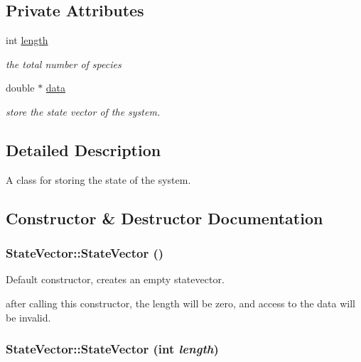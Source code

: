 \subsection*{Private Attributes}
\begin{CompactItemize}
\item 
\hypertarget{class_state_vector_ff012ea1d77d2ca71e36b47960d45db8}{
int \hyperlink{class_state_vector_ff012ea1d77d2ca71e36b47960d45db8}{length}}
\label{class_state_vector_ff012ea1d77d2ca71e36b47960d45db8}

\begin{CompactList}\small\item\em the total number of species \item\end{CompactList}\item 
double $\ast$ \hyperlink{class_state_vector_1bbbbb188a0b7cdb6c4c19591d771855}{data}
\begin{CompactList}\small\item\em store the state vector of the system. \item\end{CompactList}\end{CompactItemize}


\subsection{Detailed Description}
A class for storing the state of the system. 



\subsection{Constructor \& Destructor Documentation}
\hypertarget{class_state_vector_6559f412ce6cc17afbb958139961010f}{
\subsubsection{\setlength{\rightskip}{0pt plus 5cm}StateVector::StateVector ()}}
\label{class_state_vector_6559f412ce6cc17afbb958139961010f}


Default constructor, creates an empty statevector. 

after calling this constructor, the length will be zero, and access to the data will be invalid. \hypertarget{class_state_vector_ea1d10f89c3a7d9e91244b6416018b52}{
\subsubsection{\setlength{\rightskip}{0pt plus 5cm}StateVector::StateVector (int {\em length})}}
\label{class_state_vector_ea1d10f89c3a7d9e91244b6416018b52}


